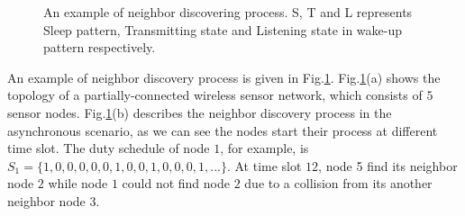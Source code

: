 \begin{figure}[!h]
\centering
{}
\vspace{0.03in}
\caption{An example of neighbor discovering process. S, T and L represents Sleep pattern, 
Transmitting state and Listening state in wake-up pattern respectively.}
\label{NDexample}
\end{figure}

An example of neighbor discovery process is given in Fig.\ref{NDexample}. 
Fig.\ref{NDexample}(a) shows the topology of a partially-connected 
wireless sensor network, which consists of $5$ sensor nodes. 
Fig.\ref{NDexample}(b) describes the neighbor discovery process 
in the asynchronous scenario, as we can see the nodes 
start their process at different time slot. The duty schedule of 
node $1$, for example, is $S_1 = \{ 1, 0, 0, 0, 0, 0, 1, 0, 0, 1, 0, 0, 0, 1, ... \}$.  
At time slot $12$, node 5 find its neighbor node $2$ while node $1$ 
could not find node $2$ due to a collision from its another neighbor node $3$. 



